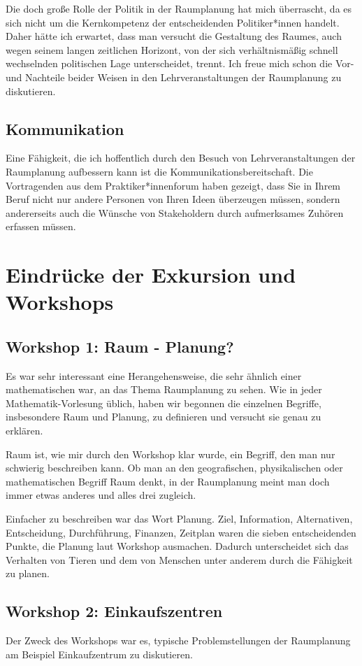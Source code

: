 \documentclass[]{article}
\begin{document}
Die doch große Rolle der Politik in der Raumplanung hat mich überrascht, da es sich nicht um die Kernkompetenz der entscheidenden Politiker*innen handelt. Daher hätte ich erwartet, dass man versucht die Gestaltung des Raumes, auch wegen seinem langen zeitlichen Horizont, von der sich verhältnismäßig schnell wechselnden politischen Lage unterscheidet, trennt. Ich freue mich schon die Vor- und Nachteile beider Weisen in den Lehrveranstaltungen der Raumplanung zu diskutieren.

\subsection{Kommunikation}
Eine Fähigkeit, die ich hoffentlich durch den Besuch von Lehrveranstaltungen der Raumplanung aufbessern kann ist die Kommunikationsbereitschaft. Die Vortragenden aus dem Praktiker*innenforum haben gezeigt, dass Sie in Ihrem Beruf nicht nur andere Personen von Ihren Ideen überzeugen müssen, sondern andererseits auch die Wünsche von Stakeholdern durch aufmerksames Zuhören erfassen müssen.

\section{Eindrücke der Exkursion und Workshops}
\subsection{Workshop 1: Raum - Planung?}
Es war sehr interessant eine Herangehensweise, die sehr ähnlich einer mathematischen war, an das Thema Raumplanung zu sehen. Wie in jeder Mathematik-Vorlesung üblich, haben wir begonnen die einzelnen Begriffe, insbesondere Raum und Planung, zu definieren und versucht sie genau zu erklären.

Raum ist, wie mir durch den Workshop klar wurde, ein Begriff, den man nur schwierig beschreiben kann. Ob man an den geografischen, physikalischen oder mathematischen Begriff Raum denkt, in der Raumplanung meint man doch immer etwas anderes und alles drei zugleich.

Einfacher zu beschreiben war das Wort Planung. Ziel, Information, Alternativen, Entscheidung, Durchführung, Finanzen, Zeitplan waren die sieben entscheidenden Punkte, die Planung laut Workshop ausmachen. Dadurch unterscheidet sich das Verhalten von Tieren und dem von Menschen unter anderem durch die Fähigkeit zu planen.

\subsection{Workshop 2: Einkaufszentren}
\label{sec:einkaufszentren}
Der Zweck des Workshops war es, typische Problemstellungen der Raumplanung am Beispiel Einkaufzentrum zu diskutieren.
\end{document}
